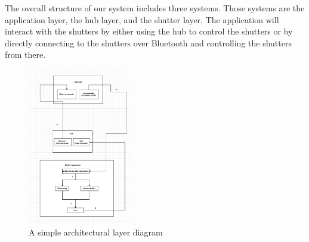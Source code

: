 The overall structure of our system includes three systems. Those systems are the application layer, the hub layer, and the shutter layer. The application will interact with the shutters by either using the hub to control the shutters or by directly connecting to the shutters over Bluetooth and controlling the shutters from there.

\begin{figure}[h!]
	\centering
 	\includegraphics[width=0.40\textwidth]{images/SysOverview}
  \caption{A simple architectural layer diagram}
\end{figure}
